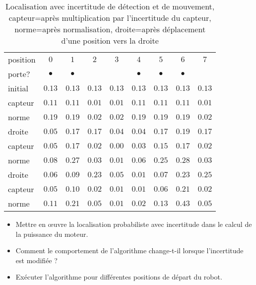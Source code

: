 \begin{table}
\caption[Localisation avec incertitude de détection et de mouvement]{Localisation avec incertitude de détection et de mouvement, capteur=après multiplication par l'incertitude du capteur, norme=après normalisation, droite=après déplacement d'une position vers la droite}\label{tab.uncertain-sensing-motion}
\setlength{\tabcolsep}{6pt}
\begin{tabular}{l|rrrrrrrr}
\hline
position&\multicolumn{1}{c}{$0$}&\multicolumn{1}{c}{$1$}&\multicolumn{1}{c}{$2$}&\multicolumn{1}{c}{$3$}&\multicolumn{1}{c}{$4$}&\multicolumn{1}{c}{$5$}&\multicolumn{1}{c}{$6$}&\multicolumn{1}{c}{$7$}\\
porte?&\multicolumn{1}{c}{$\bullet$}&\multicolumn{1}{c}{$\bullet$}&&&\multicolumn{1}{c}{$\bullet$}&\multicolumn{1}{c}{$\bullet$}&\multicolumn{1}{c}{$\bullet$}&\\
\hline
initial  & $0.13$ & $0.13$ & $0.13$ & $0.13$ & $0.13$ & $0.13$ & $0.13$ & $0.13$\\
capteur & $0.11$ & $0.11$ & $0.01$ & $0.01$ & $0.11$ & $0.11$ & $0.11$ & $0.01$\\
norme     & $0.19$ & $0.19$ & $0.02$ & $0.02$ & $0.19$ & $0.19$ & $0.19$ & $0.02$\\
\hline
droite    & $0.05$ & $0.17$ & $0.17$ & $0.04$ & $0.04$ & $0.17$ & $0.19$ & $0.17$\\
capteur & $0.05$ & $0.17$ & $0.02$ & $0.00$ & $0.03$ & $0.15$ & $0.17$ & $0.02$\\
norme     & $0.08$ & $0.27$ & $0.03$ & $0.01$ & $0.06$ & $0.25$ & $0.28$ & $0.03$\\
\hline
droite    & $0.06$ & $0.09$ & $0.23$ & $0.05$ & $0.01$ & $0.07$ & $0.23$ & $0.25$\\
capteur & $0.05$ & $0.10$ & $0.02$ & $0.01$ & $0.01$ & $0.06$ & $0.21$ & $0.02$\\
norme     & $0.11$ & $0.21$ & $0.05$ & $0.01$ & $0.02$ & $0.13$ & $0.43$ & $0.05$\\
\hline
\end{tabular}
\end{table}

\begin{framed}
\begin{itemize}
\item Mettre en œuvre la localisation probabiliste avec incertitude dans le calcul de la puissance du moteur.
\item Comment le comportement de l'algorithme change-t-il lorsque l'incertitude est modifiée ?
\item Exécuter l'algorithme pour différentes positions de départ du robot.
\end{itemize}
\end{framed}


